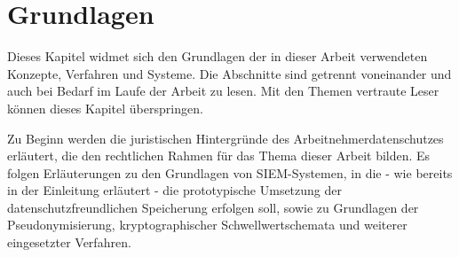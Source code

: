 \chapter{Grundlagen}

\label{cha_basics}

Dieses Kapitel widmet sich den Grundlagen der in dieser Arbeit verwendeten Konzepte, Verfahren und Systeme. Die Abschnitte sind getrennt voneinander und auch bei Bedarf im Laufe der Arbeit zu lesen. Mit den Themen vertraute Leser können dieses Kapitel überspringen.

Zu Beginn werden die juristischen Hintergründe des Arbeitnehmerdatenschutzes erläutert, die den rechtlichen Rahmen für das Thema dieser Arbeit bilden. Es folgen Erläuterungen zu den Grundlagen von SIEM-Systemen, in die - wie bereits in der Einleitung erläutert - die prototypische Umsetzung der datenschutzfreundlichen Speicherung erfolgen soll, sowie zu Grundlagen der Pseudonymisierung, kryptographischer Schwellwertschemata und weiterer eingesetzter Verfahren.

%









